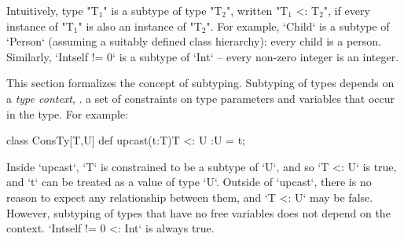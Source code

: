 Intuitively, type \xcdmath"T$_1$" is a subtype of type \xcdmath"T$_2$", 
written \xcdmath"T$_1$ <: T$_2$", 
if
every instance of \xcdmath"T$_1$" is also an instance of \xcdmath"T$_2$".  For
example, \xcd`Child` is a subtype of \xcd`Person` (assuming a suitably defined
class hierarchy): every child is a person.  Similarly, \xcd`Int{self != 0}`
is a subtype of \xcd`Int` -- every non-zero integer is an integer.  

This section formalizes the concept of subtyping. Subtyping of types depends
on a {\em type context}, \viz. a set of constraints on type parameters
and variables that occur in the type.
For example: 

\begin{xten}
class ConsTy[T,U] {
   def upcast(t:T){T <: U} :U = t;
}
\end{xten}
%
\noindent
Inside \xcd`upcast`, \xcd`T` is constrained to be a subtype of \xcd`U`, and so
\xcd`T <: U` is true, and \xcd`t` can be treated as a value of type \xcd`U`.  
Outside of \xcd`upcast`, there is no reason to expect any relationship between
them, and \xcd`T <: U` may be false.
However, subtyping of types that have no free variables does not depend
on the context.    \xcd`Int{self != 0} <: Int` is always
true.



